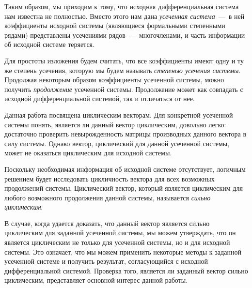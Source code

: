 Таким образом, мы приходим к тому, что исходная дифференциальная система нам известна не полностью.
Вместо этого нам дана \emph{усеченная система}~---~в ней коэффициенты исходной системы (являющиеся формальными степенными рядами) представлены
усечениями рядов~---~многочленами, и часть информации об исходной системе теряется.

Для простоты изложения будем считать, что все коэффициенты имеют одну и ту же степень усечения,
которую мы будем называть \emph{степенью усечения системы}.
Продолжая некоторым образом коэффициенты усеченной системы, можно получить \emph{продолжение} усеченной системы.
Продолжение может как совпадать с исходной дифференциальной системой, так и отличаться от нее.
\medskip

Данная работа посвящена циклическим векторам.
Для конкретной усеченной системы понять, является ли данный вектор циклическим, довольно легко:
достаточно проверить невырожденность матрицы производных данного вектора в силу системы.
Однако вектор, циклический для данной усеченной системы, может не оказаться циклическим для исходной системы.

Поскольку необходимая информация об исходной системе отсутствует,
логичным решением будет исследовать цикличность вектора для всех возможных продолжений системы.
Циклический вектор, который является циклическим для любого возможного продолжения данной системы, называется \emph{сильно циклическим}.

В случае, когда удается доказать, что данный вектор является сильно циклическим для заданной усеченной системы,
мы можем утверждать, что он является циклическим не только для усеченной системы, но и для исходной системы.
Это означает, что мы можем применить некоторые методы к заданной усеченной системе и получить результат,
согласующийся с исходной дифференциальной системой.
Проверка того, является ли заданный вектор сильно циклическим, представляет основной интерес данной работы.
